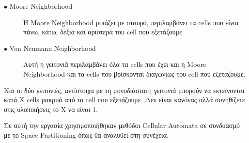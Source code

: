 \begin{description}
  \item[$\bullet$ Moore Neighborhood] Η Moore Neighborhood μοιάζει με σταυρό, περιλαμβάνει τα cells που είναι πάνω, κάτω, δεξιά και αριστερά του cell που εξετάζουμε. 
    \item[$\bullet$ Von Neumann Neighborhood] Αυτή η γειτονιά περιλαμβάνει όλα τα cells που έχει και η Moore Neighborhood και τα cells που βρίσκονται διαγωνίως του cell που εξετάζουμε.
\end{description}
Και οι δύο γειτονιές, αντίστοιχα με τη μονοδιάστατη γειτονιά μπορούν να εκτείνονται κατά X cells μακρυά από το cell που εξετάζουμε. Δεν είναι κανόνας αλλά συνηθίζετε στις υλοποιήσεις το X να είναι 1.
\par
Σε αυτή την εργασία χρησιμοποιήθηκαν μεθόδοι Cellular Automata σε συνδυασμό με το Space Partitioning όπως θα αναλυθεί στη συνέχεια.


